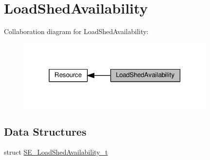 \hypertarget{group__LoadShedAvailability}{}\section{Load\+Shed\+Availability}
\label{group__LoadShedAvailability}
Collaboration diagram for Load\+Shed\+Availability\+:\nopagebreak
\begin{figure}[H]
\begin{center}
\leavevmode
\includegraphics[width=282pt]{group__LoadShedAvailability}
\end{center}
\end{figure}
\subsection*{Data Structures}
\begin{DoxyCompactItemize}
\item 
struct \hyperlink{structSE__LoadShedAvailability__t}{S\+E\+\_\+\+Load\+Shed\+Availability\+\_\+t}
\end{DoxyCompactItemize}
